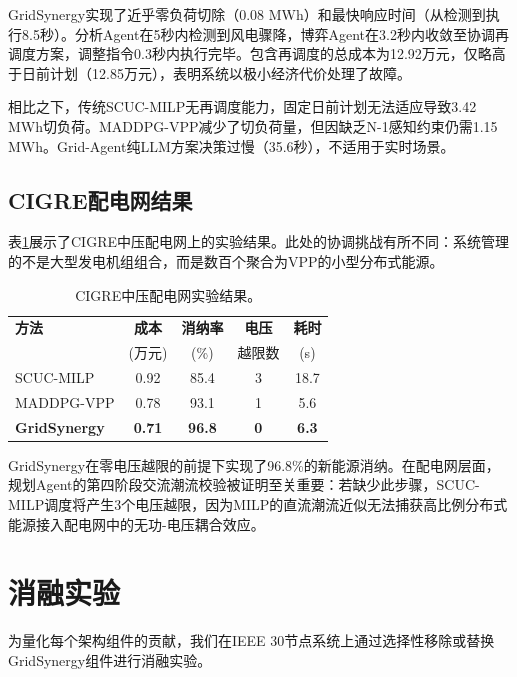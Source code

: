 \documentclass[conference]{IEEEtran}
\begin{document}
GridSynergy实现了近乎零负荷切除（0.08 MWh）和最快响应时间（从检测到执行8.5秒）。分析Agent在5秒内检测到风电骤降，博弈Agent在3.2秒内收敛至协调再调度方案，调整指令0.3秒内执行完毕。包含再调度的总成本为12.92万元，仅略高于日前计划（12.85万元），表明系统以极小经济代价处理了故障。

相比之下，传统SCUC-MILP无再调度能力，固定日前计划无法适应导致3.42 MWh切负荷。MADDPG-VPP减少了切负荷量，但因缺乏N-1感知约束仍需1.15 MWh。Grid-Agent纯LLM方案决策过慢（35.6秒），不适用于实时场景。

\subsection{CIGRE配电网结果}

表\ref{tab:cigre}展示了CIGRE中压配电网上的实验结果。此处的协调挑战有所不同：系统管理的不是大型发电机组组合，而是数百个聚合为VPP的小型分布式能源。

\begin{table}[t]
\centering
\caption{CIGRE中压配电网实验结果。}
\label{tab:cigre}
\begin{tabular}{lcccc}
\toprule
\textbf{方法} & \textbf{成本} & \textbf{消纳率} & \textbf{电压} & \textbf{耗时} \\
 & (万元) & (\%) & 越限数 & (s) \\
\midrule
SCUC-MILP         & 0.92 & 85.4 & 3 & 18.7 \\
MADDPG-VPP        & 0.78 & 93.1 & 1 & 5.6 \\
\textbf{GridSynergy} & \textbf{0.71} & \textbf{96.8} & \textbf{0} & \textbf{6.3} \\
\bottomrule
\end{tabular}
\end{table}

GridSynergy在零电压越限的前提下实现了96.8\%的新能源消纳。在配电网层面，规划Agent的第四阶段交流潮流校验被证明至关重要：若缺少此步骤，SCUC-MILP调度将产生3个电压越限，因为MILP的直流潮流近似无法捕获高比例分布式能源接入配电网中的无功-电压耦合效应。

\section{消融实验}

为量化每个架构组件的贡献，我们在IEEE 30节点系统上通过选择性移除或替换GridSynergy组件进行消融实验。
\end{document}
